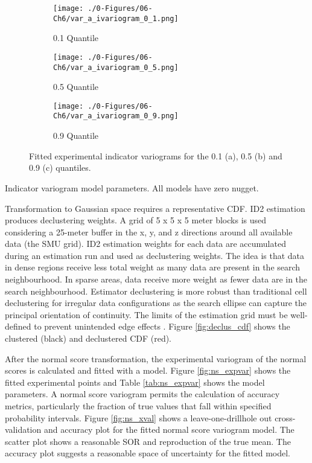 \begin{figure}
    \begin{subfigure}{1.0\textwidth}
        \centering
        \texttt{[image: ./0-Figures/06-Ch6/var\_a\_ivariogram\_0\_1.png]}
        \caption{0.1 Quantile}
    \end{subfigure}
    \begin{subfigure}{1.0\textwidth}
        \centering
        \texttt{[image: ./0-Figures/06-Ch6/var\_a\_ivariogram\_0\_5.png]}
        \caption{0.5 Quantile}
    \end{subfigure}
    \begin{subfigure}{1.0\textwidth}
        \centering
        \texttt{[image: ./0-Figures/06-Ch6/var\_a\_ivariogram\_0\_9.png]}
        \caption{0.9 Quantile}
    \end{subfigure}
    \caption{Fitted experimental indicator variograms for the 0.1 (a), 0.5 (b) and 0.9 (c) quantiles.}
    \label{fig:ind_expvar}
\end{figure}

\begin{table}[!htb]
    \centering
    \caption{Indicator variogram model parameters. All models have zero nugget.}
    \resizebox{0.9\width}{!}{}
    \label{tab:ind_expvar}
\end{table}

Transformation to Gaussian space requires a representative \gls{CDF}.  \Gls{ID2} estimation produces declustering weights. A grid of 5 x 5 x 5 meter blocks is used considering a 25-meter buffer in the x, y, and z directions around all available data (the \gls{SMU} grid). \Gls{ID2} estimation weights for each data are accumulated during an estimation run and used as declustering weights. The idea is that data in dense regions receive less total weight as many data are present in the search neighbourhood. In sparse areas, data receive more weight as fewer data are in the search neighbourhood. Estimator declustering is more robust than traditional cell declustering for irregular data configurations as the search ellipse can capture the principal orientation of continuity. The limits of the estimation grid must be well-defined to prevent unintended edge effects \citep{Wilde2007}. Figure \ref{fig:declus_cdf} shows the clustered (black) and declustered \gls{CDF} (red).

After the normal score transformation, the experimental variogram of the normal scores is calculated and fitted with a model. Figure \ref{fig:ns_expvar} shows the fitted experimental points and Table \ref{tab:ns_expvar} shows the model parameters. A normal score variogram permits the calculation of accuracy metrics, particularly the fraction of true values that fall within specified probability intervals. Figure \ref{fig:ns_xval} shows a leave-one-drillhole out cross-validation and accuracy plot for the fitted normal score variogram model. The scatter plot shows a reasonable \gls{SOR} and reproduction of the true mean. The accuracy plot suggests a reasonable space of uncertainty for the fitted model.

